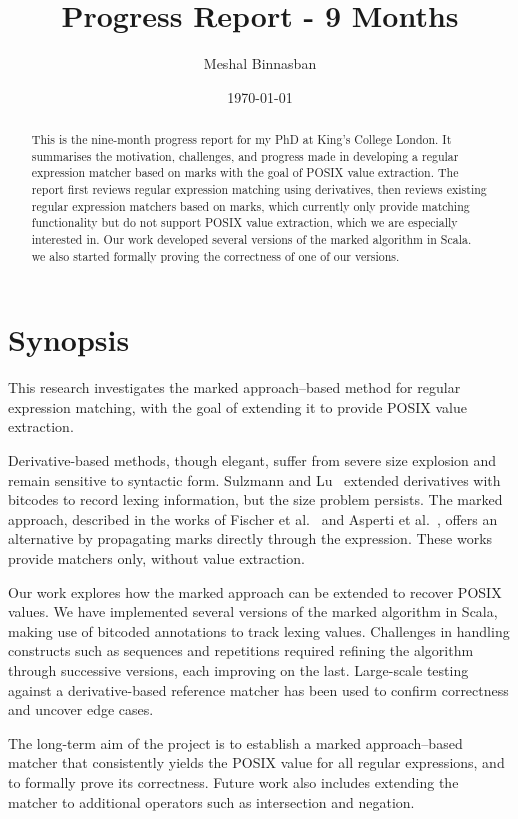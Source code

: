 \documentclass[12pt]{article}
\title{Progress Report - 9 Months}
\author{Meshal Binnasban}
\date{\today}
\begin{document}
\maketitle


\begin{abstract}
This is the nine-month progress report for my PhD at King’s College London. It summarises the motivation,
challenges, and progress made in developing a regular expression matcher based on marks with the goal
of POSIX value extraction. The report first reviews regular expression matching using derivatives, then 
reviews existing regular expression matchers based on marks, which currently only provide matching 
functionality but do not support POSIX value extraction, which we are especially interested in. Our work
developed several versions of the marked algorithm in Scala. we also started formally proving the
correctness of one of our versions.
\end{abstract}


\newpage

\section*{Synopsis}
This research investigates the marked approach--based method for regular expression 
matching, with the goal of extending it to provide POSIX value extraction.

Derivative-based methods, though elegant, suffer from severe size explosion and remain 
sensitive to syntactic form. Sulzmann and Lu~\cite{Sulzmann2014} extended derivatives with 
bitcodes to record lexing information, but the size problem persists. The marked approach, 
described in the works of Fischer et al.~\cite{Fischer2010} and Asperti et al.~\cite{Asperti2010}, 
offers an alternative by propagating marks directly through the expression. These works provide 
matchers only, without value extraction.  

Our work explores how the marked approach can be extended to recover POSIX values.  
We have implemented several versions of the marked algorithm in Scala, making use of bitcoded
annotations to track lexing values. Challenges in handling constructs such as sequences and repetitions
required refining the algorithm through successive versions, each improving on the last.  
Large-scale testing against a derivative-based reference matcher has been used to confirm correctness 
and uncover edge cases.  

The long-term aim of the project is to establish a marked approach--based matcher that consistently
yields the POSIX value for all regular expressions, and to formally prove its correctness. Future work
also includes extending the matcher to additional operators such as intersection and negation.  
\end{document}
